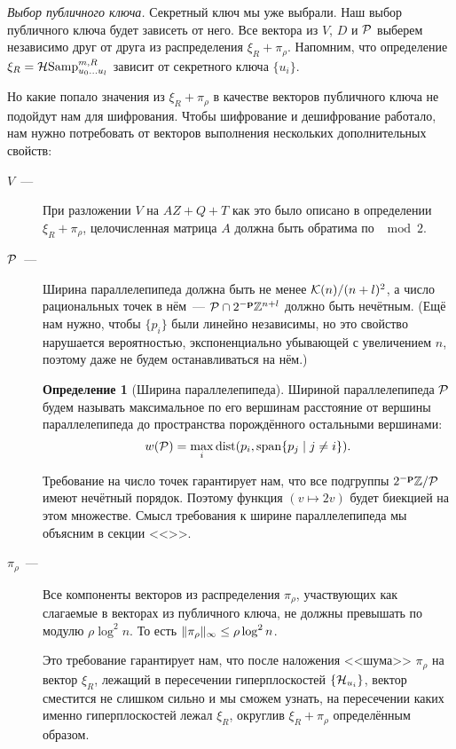 \documentclass[oneside, a4paper]{article}
\theoremstyle{plain}
\theoremstyle{definition}
\newtheorem{defn}{Определение}
\theoremstyle{remark}
\newenvironment{definition}[1]{
\begin{defn}[#1]
}{
\end{defn}
}
\DeclareMathOperator{\Span}{span}
\DeclareMathOperator{\dist}{dist}
\newcommand\p{\ensuremath \mathbf p}
\newcommand\PP{\ensuremath \mathcal P}
\newcommand\KK{\ensuremath \mathcal K}
\newcommand\Z{\ensuremath \mathbb Z}
\newcommand\HS{\ensuremath \operatorname{\mathcal H Samp}}
\newcommand\HH{\ensuremath \operatorname{\mathcal H}}
\DeclarePairedDelimiter\norm{\lVert}{\rVert}
\begin{document}
\emph{Выбор публичного ключа.} Секретный ключ мы уже выбрали. Наш выбор
публичного ключа будет зависеть от него. Все вектора из $V$, $D$ и $\PP$ выберем
независимо друг от друга из распределения $\xi_R + \pi_\rho$. Напомним, что
определение $\xi_R = \HS^{m, R}_{u_0 \dots u_l}$ зависит от секретного ключа
$\{u_i\}$.

Но какие попало значения из $\xi_R + \pi_\rho$ в качестве векторов публичного
ключа не подойдут нам для шифрования. Чтобы шифрование и дешифрование работало,
нам нужно потребовать от векторов выполнения нескольких дополнительных свойств:
\begin{description}
  \item[$V$~---] При разложении $V$ на $AZ + Q + T$ как это было описано в
  определении $\xi_R + \pi_\rho$, целочисленная матрица $A$ должна быть обратима
  по ${\mod 2}$.

  \item[$\PP$~---] Ширина параллелепипеда должна быть не менее $\KK(n)/(n+l)^2$,
  а число рациональных точек в нём~--- $\PP \cap 2^{-\p}\Z^{n+l}$ должно быть
  нечётным. (Ещё нам нужно, чтобы $\{p_i\}$ были линейно независимы, но это
  свойство нарушается вероятностью, экспоненциально убывающей с увеличением $n$,
  поэтому даже не будем останавливаться на нём.)

  \begin{definition}{Ширина параллелепипеда}
  Шириной параллелепипеда $\PP$ будем называть максимальное по его вершинам
  расстояние от вершины параллелепипеда до пространства порождённого остальными
  вершинами:
  \[
  w(\PP) = \max_i \dist(p_i, \Span \{ p_j \mid j \neq i\}).
  \]
  \end{definition}

  Требование на число точек гарантирует нам, что все подгруппы $2^{-\p}\Z / \PP$
  имеют нечётный порядок. Поэтому функция $(v \mapsto 2v)$ будет биекцией на
  этом множестве. Смысл требования к ширине параллелепипеда мы объясним в секции
  <<>>.

  \item[$\pi_\rho$~---] Все компоненты векторов из распределения $\pi_\rho$,
  участвующих как слагаемые в векторах из публичного ключа, не должны превышать
  по модулю $\rho \log^2 n$. То есть $\norm{\pi_\rho}_\infty \leq \rho \log^2
  n$.

  Это требование гарантирует нам, что после наложения <<шума>> $\pi_\rho$ на
  вектор $\xi_R$, лежащий в пересечении гиперплоскостей $\{\HH_{u_i}\}$, вектор
  сместится не слишком сильно и мы сможем узнать, на пересечении каких именно
  гиперплоскостей лежал $\xi_R$, округлив $\xi_R + \pi_\rho$ определённым
  образом.
\end{description}
\end{document}

